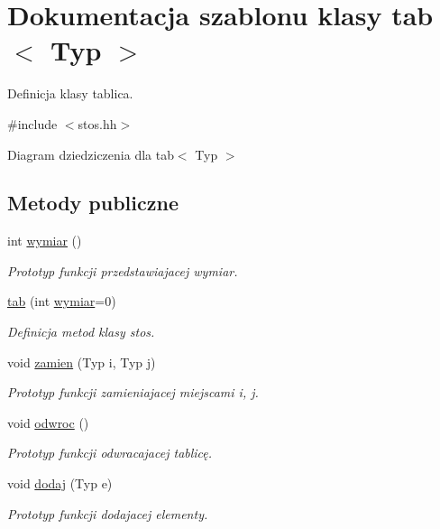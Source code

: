 \hypertarget{classtab}{\section{\-Dokumentacja szablonu klasy tab$<$ \-Typ $>$}
\label{classtab}
}


\-Definicja klasy tablica.  




{\ttfamily \#include $<$stos.\-hh$>$}



\-Diagram dziedziczenia dla tab$<$ \-Typ $>$
\subsection*{\-Metody publiczne}
\begin{DoxyCompactItemize}
\item 
int \hyperlink{classtab_aedffa47955ffaea9876790a5fdbd9562}{wymiar} ()
\begin{DoxyCompactList}\small\item\em \-Prototyp funkcji przedstawiajacej wymiar. \end{DoxyCompactList}\item 
\hyperlink{classtab_a36068a968872b0263096a9719a2ad5bb}{tab} (int \hyperlink{classtab_aedffa47955ffaea9876790a5fdbd9562}{wymiar}=0)
\begin{DoxyCompactList}\small\item\em \-Definicja metod klasy stos. \end{DoxyCompactList}\item 
void \hyperlink{classtab_a47d35ab4fd1e07333de71f9eb4b7fab2}{zamien} (\-Typ i, \-Typ j)
\begin{DoxyCompactList}\small\item\em \-Prototyp funkcji zamieniajacej miejscami i, j. \end{DoxyCompactList}\item 
void \hyperlink{classtab_a3892398e71e9d23417c8dce1b1ba852f}{odwroc} ()
\begin{DoxyCompactList}\small\item\em \-Prototyp funkcji odwracajacej tablicę. \end{DoxyCompactList}\item 
void \hyperlink{classtab_a5abb6bb51a476b922d00f8f3e8615f24}{dodaj} (\-Typ e)
\begin{DoxyCompactList}\small\item\em \-Prototyp funkcji dodajacej elementy. \end{DoxyCompactList}\item 

\end{DoxyCompactItemize}
